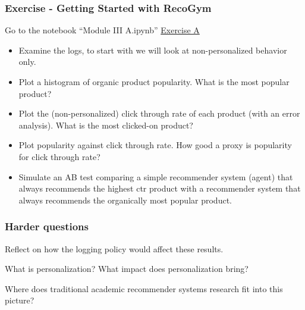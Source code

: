   \begin{frame}
    \frametitle{Exercise - Getting Started with RecoGym}

    Go to the notebook ``Module III A.ipynb'' \href{https://colab.research.google.com/github/criteo-research/reco-gym/blob/DS3/Module\%20III\%20A.ipynb}{Exercise A}

\begin{itemize}
  \item Examine the logs, to start with we will look at non-personalized behavior only.
  \item Plot a histogram of organic product popularity. What is the most popular product?  
  \item Plot the (non-personalized) click through rate of each product (with an error analysis).  What is the most clicked-on product?
  \item Plot popularity against click through rate.  How good a proxy is popularity for click through rate?
  \item Simulate an AB test comparing a simple recommender system (agent) that always recommends the highest ctr product with a recommender system that always recommends the organically most popular product.
\end{itemize}

\end{frame}

\begin{frame}
  \frametitle{Harder questions}

Reflect on how the logging policy would affect these results.

\pause

What is personalization? What impact does personalization bring?

\pause

Where does traditional academic recommender systems research fit into this picture?  

\end{frame}


